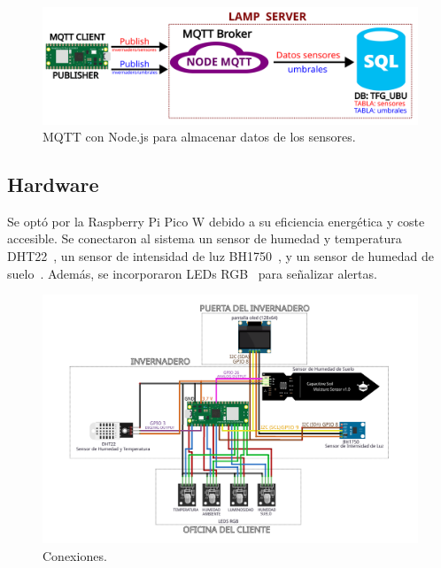 \begin{figure}[h]
	\centering
	\includegraphics[width=1\textwidth]{img/diagramas/mqtt_nodeMqtt.png}
	\caption{MQTT con Node.js para almacenar datos de los sensores.}
\end{figure}


\subsection{Hardware}\label{proyecto:Hardware}

Se optó por la Raspberry Pi Pico W debido a su eficiencia energética y coste accesible. Se conectaron al sistema un sensor de humedad y temperatura DHT22~\cite{manual:DHT22}, un sensor de intensidad de luz BH1750~\cite{manual:BH1750}, y un sensor de humedad de suelo~\cite{wiki:SensorHumedadSuelo}. Además, se incorporaron LEDs RGB~\cite{manual:LedRGB} para señalizar alertas.

\begin{figure}[h]
    \centering
    \includegraphics[width=1\textwidth]{img/diagramas/conexiones.png}
    \caption{Conexiones.} \label{Img:conexionesHardware}
\end{figure}

